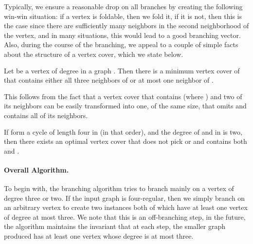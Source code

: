\documentclass[svgnames]{llncs}
\begin{document}
Typically, we ensure a reasonable drop on all branches by creating the following win-win situation: if a vertex is foldable, then we fold it, if it is not, 
then this is the case since there are sufficiently many neighbors in the second neighborhood of the vertex, and in many situations, this would lead to a good branching vector. Also, during the course of the branching, we appeal to a couple of simple facts about the structure of a vertex cover, which we state below.




\begin{lemma}\cite[First part of Lemma 3.2]{CKJ99}
\label{lem:deg3neighborhood}
Let  be a vertex of degree  in a graph . Then there is a minimum vertex cover
of  that contains either all three neighbors of  or at most one neighbor of .
\end{lemma}



This follows from the fact that a vertex cover that contains  (where ) and two of its neighbors can be easily transformed into one, of the same size, that omits  and contains all of its neighbors. 

\begin{proposition}
\label{prop:c4}
If  form a cycle of length four in  (in that order), and the degree of  and  in  is two, then there exists an optimal vertex cover that does not pick  or  and contains both  and .
\end{proposition}


\paragraph{Overall Algorithm.} To begin with, the branching algorithm tries to branch mainly on a vertex of degree three or two. If the input graph is four-regular, 
then we simply branch on an arbitrary vertex to create two instances both of which have at least one vertex of degree at most three. We note that this is 
an off-branching step, in the future, the algorithm maintains the invariant that at each step, the smaller graph produced has at least one vertex whose degree is at most three. 
\end{document}

